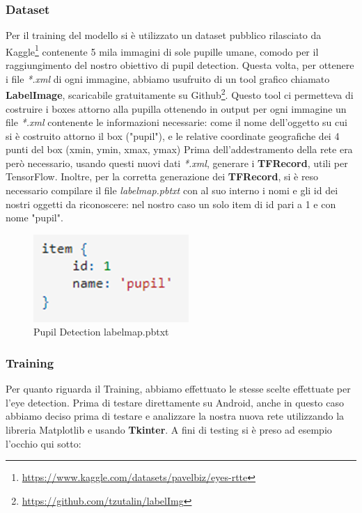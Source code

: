 \documentclass[11pt]{article}
\begin{document}
\subsubsection{Dataset}
\label{ssu:dat}
Per il training del modello si è utilizzato un dataset pubblico rilasciato da Kaggle\footnote{\url{https://www.kaggle.com/datasets/pavelbiz/eyes-rtte}} contenente 5 mila immagini di sole pupille umane, comodo per il raggiungimento del nostro obiettivo di pupil detection.
\newline
Questa volta, per ottenere i file \textit{*.xml} di ogni immagine, abbiamo usufruito di un tool grafico chiamato \textbf{LabelImage}, scaricabile gratuitamente su Github\footnote{\url{https://github.com/tzutalin/labelImg}}. Questo tool ci permetteva di costruire i boxes attorno alla pupilla ottenendo in output per ogni immagine un file \textit{*.xml} contenente le informazioni necessarie: come il nome dell'oggetto su cui si è costruito attorno il box ("pupil"), e le relative coordinate geografiche dei 4 punti del box (xmin, ymin, xmax, ymax)
\newline \newline
Prima dell'addestramento della rete era però necessario, usando questi nuovi dati \textit{*.xml}, generare i \textbf{TFRecord}, utili per TensorFlow.
Inoltre, per la corretta generazione dei \textbf{TFRecord}, si è reso necessario compilare il file \textit{labelmap.pbtxt} con al suo interno i nomi e gli id dei nostri oggetti da riconoscere: nel nostro caso un solo item di id pari a 1 e con nome "pupil".

\begin{figure}[h]
\caption{Pupil Detection labelmap.pbtxt}
\centering
\includegraphics[scale=1]{img/item2.png}
\end{figure}

\subsubsection{Training}
\label{sub:tra}
Per quanto riguarda il Training, abbiamo effettuato le stesse scelte effettuate per l'eye detection.
\newline
Prima di testare direttamente su Android, anche in questo caso abbiamo deciso prima di testare e analizzare la nostra nuova rete utilizzando la libreria Matplotlib e usando \textbf{Tkinter}.
\newline
\newline
A fini di testing si è preso ad esempio l'occhio qui sotto:
\end{document}
